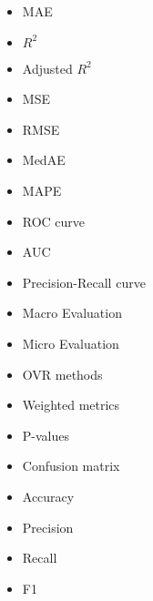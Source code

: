 \begin{itemize}
    \item MAE
    \item $R^2$
    \item Adjusted $R^2$
    \item MSE
    \item RMSE
    \item MedAE
    \item MAPE
    \item ROC curve
    \item AUC
    \item Precision-Recall curve
    \item Macro Evaluation
    \item Micro Evaluation
    \item OVR methods
    \item Weighted metrics
    \item P-values
    \item Confusion matrix
    \item Accuracy
    \item Precision
    \item Recall
    \item F1
\end{itemize}
